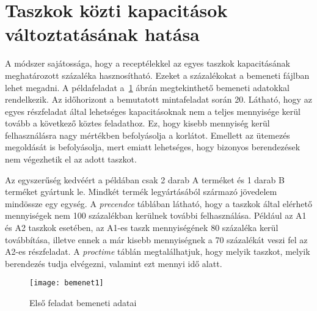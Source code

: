 \section{Taszkok közti kapacitások változtatásának hatása}
A módszer sajátossága, hogy a receptélekkel az egyes taszkok kapacitásának meghatározott százaléka hasznosítható. Ezeket a százalékokat a bemeneti fájlban lehet megadni. A példafeladat a~\ref{bemenet1} ábrán megtekinthető bemeneti adatokkal rendelkezik. Az időhorizont a bemutatott mintafeladat során 20. Látható, hogy az egyes részfeladat által lehetséges kapacitásoknak nem a teljes mennyisége kerül tovább a következő köztes feladathoz. Ez, hogy kisebb mennyiség kerül felhasználásra nagy mértékben befolyásolja a korlátot. Emellett az ütemezés megoldását is befolyásolja, mert emiatt lehetséges, hogy bizonyos berendezések nem végezhetik el az adott taszkot.

Az egyszerűség kedvéért a példában csak 2 darab A terméket és 1 darab B terméket gyártunk le. Mindkét termék legyártásából származó jövedelem mindössze egy egység. A \textit{precendce} táblában látható, hogy a taszkok által elérhető mennyiségek nem 100 százalékban kerülnek további felhasználása. Például az A1 és A2 taszkok esetében, az A1-es taszk mennyiségének 80 százaléka kerül továbbítása, illetve ennek a már kisebb mennyiségnek a 70 százalékát veszi fel az A2-es részfeladat. A \textit{proctime} táblán megtalálhatjuk, hogy melyik taszkot, melyik berendezés tudja elvégezni, valamint ezt mennyi idő alatt.
 
\begin{figure}[H]
\begin{center}
\texttt{[image: bemenet1]}
\caption{Első feladat bemeneti adatai}
\label{bemenet1}
\end{center}
\end{figure}

